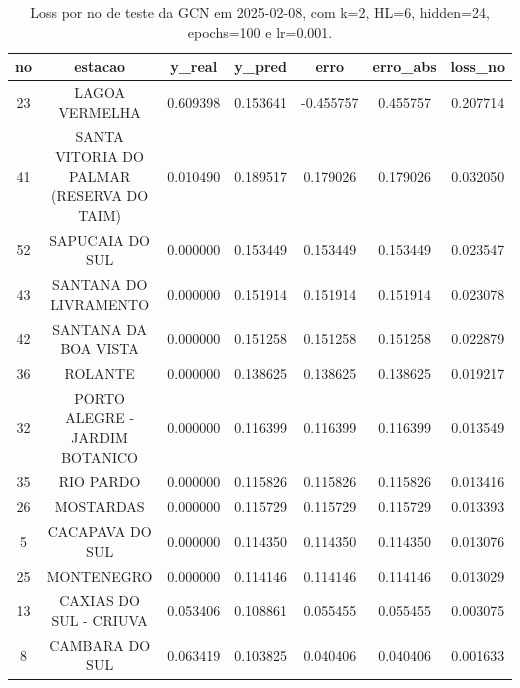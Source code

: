 \begin{table}[h]
\centering
\caption{Loss por no de teste da GCN em 2025-02-08, com k=2, HL=6, hidden=24, epochs=100 e lr=0.001.}
\label{tab:gcn_loss_k2_hl6_h24_e100_d20250208}
\begin{tabular}{ccccccc}
\toprule
no & estacao & y\_real & y\_pred & erro & erro\_abs & loss\_no \\
\midrule
23 & LAGOA VERMELHA & 0.609398 & 0.153641 & -0.455757 & 0.455757 & 0.207714 \\
41 & SANTA VITORIA DO PALMAR (RESERVA DO TAIM) & 0.010490 & 0.189517 & 0.179026 & 0.179026 & 0.032050 \\
52 & SAPUCAIA DO SUL & 0.000000 & 0.153449 & 0.153449 & 0.153449 & 0.023547 \\
43 & SANTANA DO LIVRAMENTO & 0.000000 & 0.151914 & 0.151914 & 0.151914 & 0.023078 \\
42 & SANTANA DA BOA VISTA & 0.000000 & 0.151258 & 0.151258 & 0.151258 & 0.022879 \\
36 & ROLANTE & 0.000000 & 0.138625 & 0.138625 & 0.138625 & 0.019217 \\
32 & PORTO ALEGRE - JARDIM BOTANICO & 0.000000 & 0.116399 & 0.116399 & 0.116399 & 0.013549 \\
35 & RIO PARDO & 0.000000 & 0.115826 & 0.115826 & 0.115826 & 0.013416 \\
26 & MOSTARDAS & 0.000000 & 0.115729 & 0.115729 & 0.115729 & 0.013393 \\
5 & CACAPAVA DO SUL & 0.000000 & 0.114350 & 0.114350 & 0.114350 & 0.013076 \\
25 & MONTENEGRO & 0.000000 & 0.114146 & 0.114146 & 0.114146 & 0.013029 \\
13 & CAXIAS DO SUL - CRIUVA & 0.053406 & 0.108861 & 0.055455 & 0.055455 & 0.003075 \\
8 & CAMBARA DO SUL & 0.063419 & 0.103825 & 0.040406 & 0.040406 & 0.001633 \\
\bottomrule
\end{tabular}
\end{table}
